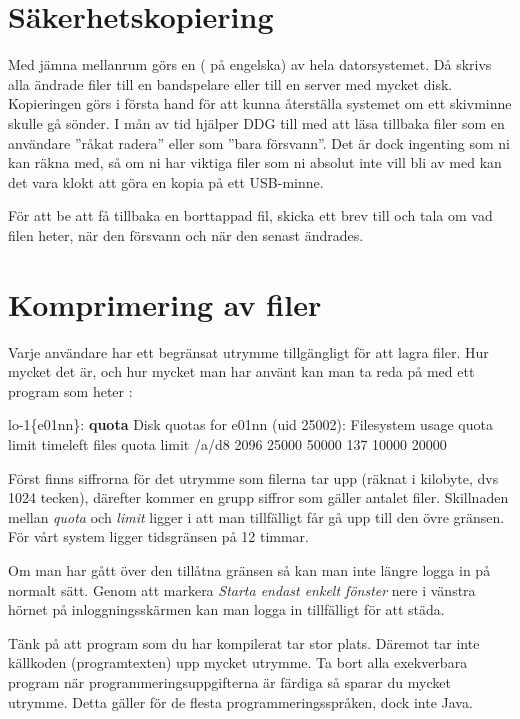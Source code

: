 \documentclass[a4paper,twocolumn]{book}
\begin{document}
\section{Säkerhetskopiering}

Med jämna mellanrum görs en 
( på engelska) av hela datorsystemet. Då skrivs alla
ändrade filer till en bandspelare eller till en server med mycket disk.
Kopieringen görs i första hand för
att kunna återställa systemet om ett skivminne skulle gå sönder. I mån
av tid hjälper DDG till med att läsa tillbaka filer som en användare
''råkat radera'' eller som ''bara försvann''. Det är dock ingenting
som ni kan räkna med, så om ni har viktiga filer som ni absolut inte
vill bli av med kan det vara klokt att göra en kopia på ett USB-minne.

För att be att få tillbaka en borttappad fil, skicka ett brev till 
 och tala om vad filen heter, när den försvann och
när den senast ändrades.

\section{Komprimering av filer}

Varje användare har ett begränsat utrymme tillgängligt för att lagra
filer. Hur mycket det är, och hur mycket man har använt kan man ta
reda på med ett program som heter :
\begin{example}
\scriptsize
lo-1\{e01nn\}: \textbf{quota}
Disk quotas for e01nn (uid 25002): 
Filesystem usage quota limit timeleft files quota limit
/a/d8       2096 25000 50000            137 10000 20000            
\end{example}
Först finns siffrorna för det utrymme som filerna tar upp (räknat i
kilobyte, dvs 1024 tecken), därefter kommer en grupp siffror som
gäller antalet filer. Skillnaden mellan \emph{quota} och \emph{limit}
ligger i att man tillfälligt får gå upp till den övre gränsen. För
vårt system ligger tidsgränsen på 12 timmar.

Om man har gått över den tillåtna gränsen så kan man inte längre logga
in på normalt sätt. Genom att markera \emph{Starta
  endast enkelt fönster} nere i vänstra hörnet på inloggningsskärmen
kan man logga in tillfälligt för att städa.

Tänk på att program som du har kompilerat tar stor plats. Däremot tar
inte källkoden (programtexten) upp mycket utrymme. Ta bort alla
exekverbara program när programmeringsuppgifterna är färdiga så sparar
du mycket utrymme. Detta gäller för de flesta programmeringsspråken,
dock inte Java.
\end{document}
